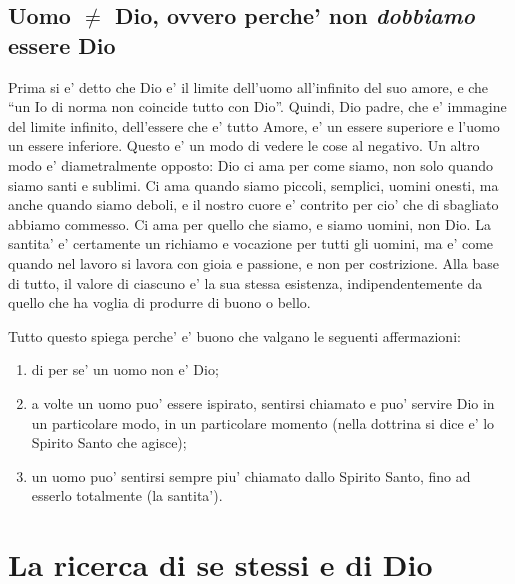  

\subsection{Uomo $\ne$ Dio, ovvero perche' non \emph{dobbiamo} essere Dio}
Prima si e' detto che Dio e' il limite dell'uomo all'infinito del suo amore, e che ``un Io di norma non coincide tutto con Dio''.
Quindi, Dio padre, che e' immagine del limite infinito, dell'essere che e' tutto Amore, e' un essere superiore e l'uomo un essere inferiore.
Questo e' un modo di vedere le cose al negativo. Un altro modo e' diametralmente opposto: Dio ci ama per come siamo, non solo quando siamo santi e sublimi. Ci ama quando siamo piccoli, semplici, uomini onesti, ma anche quando siamo deboli, e il nostro cuore e' contrito per cio' che di sbagliato abbiamo commesso. Ci ama per quello che siamo, e siamo uomini, non Dio. La santita' e' certamente un richiamo e vocazione per tutti gli uomini, ma e' come quando nel lavoro si lavora con gioia e passione, e non per costrizione. Alla base di tutto, il valore di ciascuno e' la sua stessa esistenza, indipendentemente da quello che ha voglia di produrre di buono o bello.

Tutto questo spiega perche' e' buono che valgano le seguenti affermazioni:
\begin{enumerate}
    \item di per se' un uomo non e' Dio;
    \item a volte un uomo puo' essere ispirato, sentirsi chiamato e puo' servire Dio in un particolare modo, in un particolare momento (nella dottrina si dice e' lo Spirito Santo che agisce);
    \item un uomo puo' sentirsi sempre piu' chiamato dallo Spirito Santo, fino ad esserlo totalmente (la santita').
\end{enumerate}


\section{La ricerca di se stessi e di Dio}
\label{laricerca}


